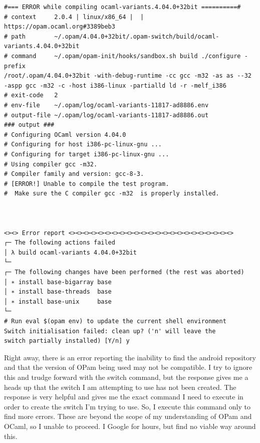\begin{verbatim}
#=== ERROR while compiling ocaml-variants.4.04.0+32bit ==========#
# context     2.0.4 | linux/x86_64 |  | https://opam.ocaml.org#3389beb3
# path        ~/.opam/4.04.0+32bit/.opam-switch/build/ocaml-
variants.4.04.0+32bit
# command     ~/.opam/opam-init/hooks/sandbox.sh build ./configure -prefix 
/root/.opam/4.04.0+32bit -with-debug-runtime -cc gcc -m32 -as as --32 
-aspp gcc -m32 -c -host i386-linux -partialld ld -r -melf_i386
# exit-code   2
# env-file    ~/.opam/log/ocaml-variants-11817-ad8886.env
# output-file ~/.opam/log/ocaml-variants-11817-ad8886.out
### output ###
# Configuring OCaml version 4.04.0
# Configuring for host i386-pc-linux-gnu ...
# Configuring for target i386-pc-linux-gnu ...
# Using compiler gcc -m32.
# Compiler family and version: gcc-8-3.
# [ERROR!] Unable to compile the test program.
#  Make sure the C compiler gcc -m32  is properly installed.



<><> Error report <><><><><><><><><><><><><><><><><><><><><><><>
┌─ The following actions failed
│ λ build ocaml-variants 4.04.0+32bit
└─ 
┌─ The following changes have been performed (the rest was aborted)
│ ∗ install base-bigarray base
│ ∗ install base-threads  base
│ ∗ install base-unix     base
└─ 
# Run eval $(opam env) to update the current shell environment
Switch initialisation failed: clean up? ('n' will leave the 
switch partially installed) [Y/n] y
\end{verbatim}
Right away, there is an error reporting the inability to find the android repository and that the version of OPam being used may not be compatible. I try to ignore this and trudge forward with the switch command, but the response gives me a heads up that the switch I am attempting to use has not been created. The response is very helpful and gives me the exact command I need to execute in order to create the switch I'm trying to use. So, I execute this command only to find more errors. These are beyond the scope of my understanding of OPam and OCaml, so I unable to proceed. I Google for hours, but find no viable way around this. 
